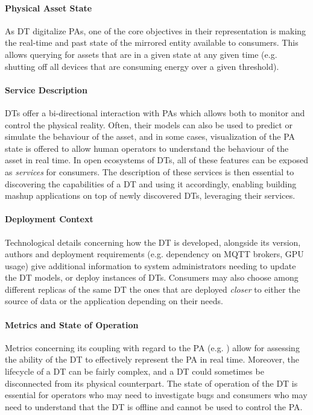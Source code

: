 \paragraph{Physical Asset State}
As DT digitalize PAs, one of the core objectives in their representation is making the real-time and past state of the mirrored entity available to consumers.
This allows querying for assets that are in a given state at any given time (e.g. shutting off all devices that are consuming energy over a given threshold).

\paragraph{Service Description}
DTs offer a bi-directional interaction with PAs which allows both to monitor and control the physical reality. Often, their models can also be used to predict or simulate the behaviour of the asset, and in some cases, visualization of the PA state is offered to allow human operators to understand the behaviour of the asset in real time.
In open ecosystems of DTs, all of these features can be exposed as \emph{services} for consumers.
The description of these services is then essential to discovering the capabilities of a DT and using it accordingly, enabling building mashup applications on top of newly discovered DTs, leveraging their services.

\paragraph{Deployment Context}
Technological details concerning how the DT is developed, alongside its version, authors and deployment requirements (e.g. dependency on MQTT brokers, GPU usage) give additional information to system administrators needing to update the DT models, or deploy instances of DTs.
%
Consumers may also choose among different replicas of the same DT the ones that are deployed \emph{closer} to either the source of data or the application depending on their needs.

\paragraph{Metrics and State of Operation}
Metrics concerning its coupling with regard to the PA (e.g. \cite{odte_journal}) allow for assessing the ability of the DT to effectively represent the PA in real time.
Moreover, the lifecycle of a DT can be fairly complex, and a DT could sometimes be disconnected from its physical counterpart. The state of operation of the DT is essential for operators who may need to investigate bugs and consumers who may need to understand that the DT is offline and cannot be used to control the PA.

